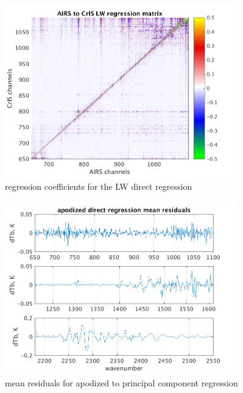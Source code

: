 \documentclass[11pt]{article}
\begin{document}
\begin{figure} %
  \centering
  \includegraphics[height=7.5cm]{slackfigs/full_7377_LW_regr_mat.png}
  \caption{regression coefficients for the LW direct regression}
  \label{dreg3}
\end{figure}

% 

\begin{figure} %
  \centering
  \includegraphics[height=7.5cm]{slackfigs/ap_pc_direct_regr.png}
  \caption{mean residuals for apodized {\airs} to {\cris} principal
    component regression}
  \label{dreg6}
\end{figure}
\end{document}
